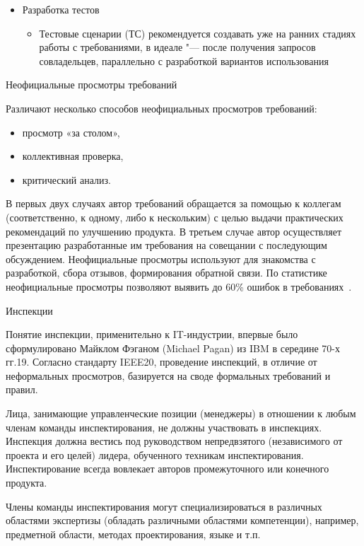 \documentclass{../industrial-development}
\begin{document}
{\begin{frame}
\begin{itemize}
\item  \alert{Разработка тестов}
\begin{itemize}
\item Тестовые сценарии (ТС) рекомендуется создавать уже на ранних стадиях работы с требованиями, в идеале "--- после получения запросов совладельцев, параллельно с разработкой вариантов использования
\end{itemize}
\end{itemize}
\end{frame}

\lecturenotes

\alert{Неофициальные просмотры требований}

Различают несколько способов неофициальных просмотров требований:
\begin{itemize}
\item просмотр «за столом»,
\item коллективная проверка,
\item критический анализ.
\end{itemize}

В первых двух случаях автор требований обращается за помощью к коллегам (соответственно, к одному, либо к нескольким) с целью выдачи практических рекомендаций по улучшению продукта. В третьем случае автор осуществляет презентацию разработанные им требования на совещании с последующим обсуждением. Неофициальные просмотры используют для знакомства с разработкой, сбора отзывов, формирования обратной связи. По статистике неофициальные просмотры позволяют выявить до 60\% ошибок в требованиях~\cite[с.~66--67]{Maglinec}.

\alert{Инспекции}

Понятие инспекции, применительно к IT-индустрии, впервые было сформулировано Майклом Фэганом (Michael Pagan) из IBM в середине 70-х гг.19. Согласно стандарту IEEE20, проведение инспекций, в отличие от неформальных просмотров, базируется на своде формальных требований и правил. 

Лица, занимающие управленческие позиции (менеджеры) в отношении к любым членам команды инспектирования, не должны участвовать в инспекциях. Инспекция должна вестись под руководством непредвзятого (независимого от проекта и его целей) лидера, обученного техникам инспектирования. Инспектирование всегда вовлекает авторов промежуточного или конечного продукта.

Члены команды инспектирования могут специализироваться в различных областями экспертизы (обладать различными областями компетенции), например, предметной области, методах проектирования, языке и т.п. 

}
\end{document}
